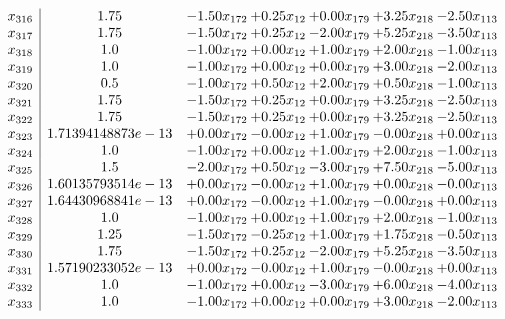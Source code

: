 \documentclass[8pt]{article}
\begin{document}
\[\begin{array}{c| c c@{\hskip 2pt} c@{\hskip 2pt} c@{\hskip 2pt} c@{\hskip 2pt} c@{\hskip 2pt} }
 x_{316}   &  1.75 & -1.50 x_{172} & +  0.25 x_{12} & +  0.00 x_{179} & +  3.25 x_{218} & -2.50 x_{113}\\
 x_{317}   &  1.75 & -1.50 x_{172} & +  0.25 x_{12} & -2.00 x_{179} & +  5.25 x_{218} & -3.50 x_{113}\\
 x_{318}   &  1.0 & -1.00 x_{172} & +  0.00 x_{12} & +  1.00 x_{179} & +  2.00 x_{218} & -1.00 x_{113}\\
 x_{319}   &  1.0 & -1.00 x_{172} & +  0.00 x_{12} & +  0.00 x_{179} & +  3.00 x_{218} & -2.00 x_{113}\\
 x_{320}   &  0.5 & -1.00 x_{172} & +  0.50 x_{12} & +  2.00 x_{179} & +  0.50 x_{218} & -1.00 x_{113}\\
 x_{321}   &  1.75 & -1.50 x_{172} & +  0.25 x_{12} & +  0.00 x_{179} & +  3.25 x_{218} & -2.50 x_{113}\\
 x_{322}   &  1.75 & -1.50 x_{172} & +  0.25 x_{12} & +  0.00 x_{179} & +  3.25 x_{218} & -2.50 x_{113}\\
 x_{323}   &  1.71394148873e-13 & +  0.00 x_{172} & -0.00 x_{12} & +  1.00 x_{179} & -0.00 x_{218} & +  0.00 x_{113}\\
 x_{324}   &  1.0 & -1.00 x_{172} & +  0.00 x_{12} & +  1.00 x_{179} & +  2.00 x_{218} & -1.00 x_{113}\\
 x_{325}   &  1.5 & -2.00 x_{172} & +  0.50 x_{12} & -3.00 x_{179} & +  7.50 x_{218} & -5.00 x_{113}\\
 x_{326}   &  1.60135793514e-13 & +  0.00 x_{172} & -0.00 x_{12} & +  1.00 x_{179} & +  0.00 x_{218} & -0.00 x_{113}\\
 x_{327}   &  1.64430968841e-13 & +  0.00 x_{172} & -0.00 x_{12} & +  1.00 x_{179} & -0.00 x_{218} & +  0.00 x_{113}\\
 x_{328}   &  1.0 & -1.00 x_{172} & +  0.00 x_{12} & +  1.00 x_{179} & +  2.00 x_{218} & -1.00 x_{113}\\
 x_{329}   &  1.25 & -1.50 x_{172} & -0.25 x_{12} & +  1.00 x_{179} & +  1.75 x_{218} & -0.50 x_{113}\\
 x_{330}   &  1.75 & -1.50 x_{172} & +  0.25 x_{12} & -2.00 x_{179} & +  5.25 x_{218} & -3.50 x_{113}\\
 x_{331}   &  1.57190233052e-13 & +  0.00 x_{172} & -0.00 x_{12} & +  1.00 x_{179} & -0.00 x_{218} & +  0.00 x_{113}\\
 x_{332}   &  1.0 & -1.00 x_{172} & +  0.00 x_{12} & -3.00 x_{179} & +  6.00 x_{218} & -4.00 x_{113}\\
 x_{333}   &  1.0 & -1.00 x_{172} & +  0.00 x_{12} & +  0.00 x_{179} & +  3.00 x_{218} & -2.00 x_{113}\\

\end{array}\]
\end{document}
